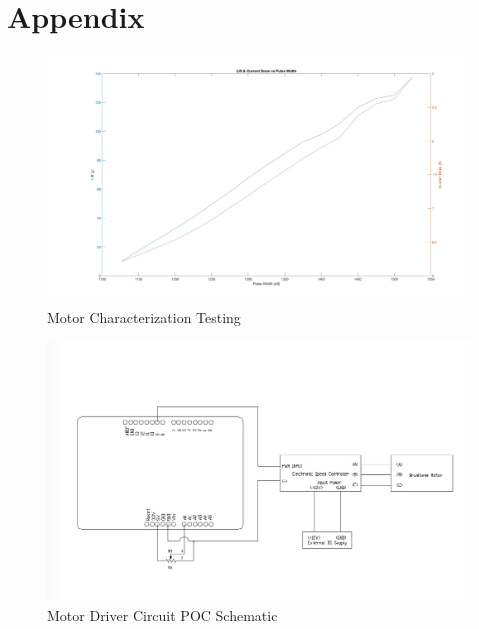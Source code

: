 \section{Appendix}

\begin{figure}[h]
  \centering
  \includegraphics[scale=0.45]{Motor_Characterization.jpg}
  \caption{Motor Characterization Testing}
  \label{fig:Motor_Char}
\end{figure}

\begin{figure}[h]
  \centering
  \includegraphics[scale=0.45]{Motor_Driving_Schematic.jpg}
  \caption{Motor Driver Circuit POC Schematic}
  \label{fig:Motor_Drive_Schem}
\end{figure}
